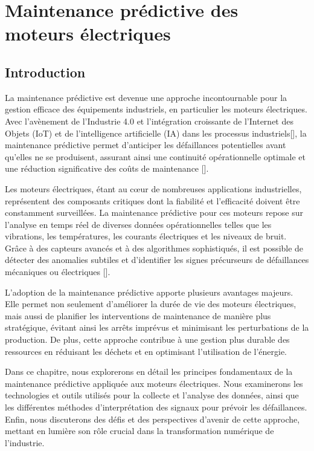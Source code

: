 \newpage

\chapter{Maintenance prédictive des moteurs électriques}
\section{Introduction}

La maintenance prédictive est devenue une approche incontournable pour la
gestion efficace des équipements industriels, en particulier les moteurs
électriques. Avec l'avènement de l'Industrie 4.0 et l'intégration croissante de
l'Internet des Objets (IoT) et de l'intelligence artificielle (IA) dans les
processus industriels[\cite{dalenogare2018industry4}], la maintenance
prédictive permet d'anticiper les défaillances potentielles avant qu'elles ne
se produisent, assurant ainsi une continuité opérationnelle optimale et une
réduction significative des coûts de maintenance [\cite{Mrozek2023}].

Les moteurs électriques, étant au cœur de nombreuses applications
industrielles, représentent des composants critiques dont la fiabilité et
l'efficacité doivent être constamment surveillées. La maintenance prédictive
pour ces moteurs repose sur l'analyse en temps réel de diverses données
opérationnelles telles que les vibrations, les températures, les courants
électriques et les niveaux de bruit. Grâce à des capteurs avancés et à des
algorithmes sophistiqués, il est possible de détecter des anomalies subtiles et
d'identifier les signes précurseurs de défaillances mécaniques ou électriques
[\cite{Bentivogli2023}].

L'adoption de la maintenance prédictive apporte plusieurs avantages majeurs.
Elle permet non seulement d'améliorer la durée de vie des moteurs électriques,
mais aussi de planifier les interventions de maintenance de manière plus
stratégique, évitant ainsi les arrêts imprévus et minimisant les perturbations
de la production. De plus, cette approche contribue à une gestion plus durable
des ressources en réduisant les déchets et en optimisant l'utilisation de
l'énergie.

Dans ce chapitre, nous explorerons en détail les principes fondamentaux de la
maintenance prédictive appliquée aux moteurs électriques. Nous examinerons les
technologies et outils utilisés pour la collecte et l'analyse des données,
ainsi que les différentes méthodes d'interprétation des signaux pour prévoir
les défaillances. Enfin, nous discuterons des défis et des perspectives
d'avenir de cette approche, mettant en lumière son rôle crucial dans la
transformation numérique de l'industrie.


